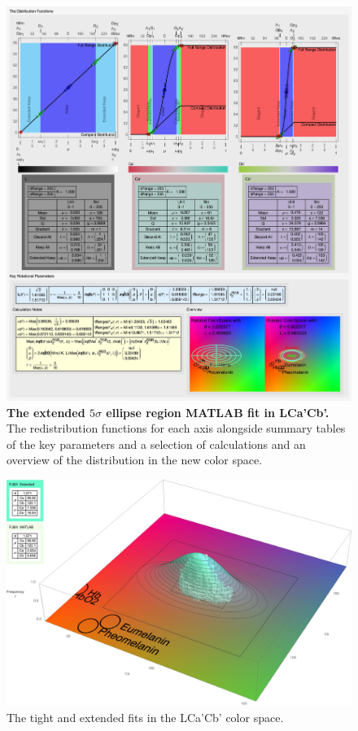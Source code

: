\begin{figure}[h!]
  \centering
  \includegraphics[width=1.0 \textwidth]{Chapter3/Figs/Distribution_Results_Final_Extended.jpg} 
    \caption{ \textbf{The extended $5\sigma$ ellipse region MATLAB fit in LCa'Cb'.} The redistribution functions for each axis alongside summary tables of the key parameters and a selection of calculations and an overview of the distribution in the new color space. }  \label{fig:DistributionResultsFinalExtended}
\end{figure}

\begin{figure}[h!]
  \centering
  \includegraphics[width=0.95 \textwidth]{Chapter3/Figs/Distribution_Results_Final_Extended_3D.jpg} 
    \caption{ The tight and extended fits in the LCa'Cb' color space.}  \label{fig:DistributionResultsFinalExtended3D}
\end{figure}

